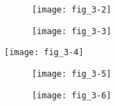 \lipsum[29-30]

\subsect{\lipsum*[21][13]}

\lipsum[31]

\sect{\lipsum*[22][1]}

\subsect{\lipsum*[22][2]}

\lipsum[27-32]

\begin{figure}[p]
   \centering
   \texttt{[image: fig\_3-2]}
   \caption[{\lipsum*[32][1]}]{\lipsum*[32][1-5]}
   \label{fig:fig_3-2}
\end{figure}

\subsect{\lipsum*[22][3]}

\lipsum[33-35]

\begin{figure}[p]
   \centering
   \texttt{[image: fig\_3-3]}
   \caption[{\lipsum*[33][1]}]{\lipsum*[33][1-5]}
   \label{fig:fig_3-3}
\end{figure}

\subsect{\lipsum*[22][4]}

\lipsum[36-37]

\begin{SCfigure}[\sidecaptionrelwidth][p]
   \centering
   \texttt{[image: fig\_3-4]}
   \caption[{\lipsum*[34][1]}]{\lipsum*[34][1-5]}
   \label{fig:fig_3-4}
\end{SCfigure}

\subsect{\lipsum*[22][5]}

\lipsum[38-40]

\begin{figure}[p]
   \centering
   \texttt{[image: fig\_3-5]}
   \caption[{\lipsum*[35][1]}]{\lipsum*[35][1-5]}
   \label{fig:fig_3-5}
\end{figure}

\subsect{\lipsum*[22][6]}

\lipsum[41-43]

\begin{figure}[p]
   \centering
   \texttt{[image: fig\_3-6]}
   \caption[{\lipsum*[36][1]}]{\lipsum*[36][1-2]}
   \label{fig:fig_3-6}
\end{figure}

